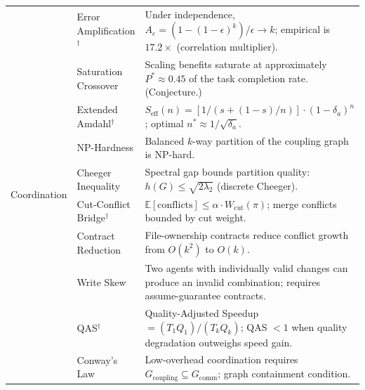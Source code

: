 \begin{table}[H]
\begin{tabular}{p{1.8cm}p{3.8cm}p{7.5cm}}
\midrule

\multirow{10}{1.8cm}{Coordination}
    & Error Amplification$^\dagger$ & Under independence, $A_e = (1-(1-\epsilon)^k)/\epsilon \to k$; empirical is $17.2\times$ (correlation multiplier). \\
    & Saturation Crossover & Scaling benefits saturate at approximately $P^* \approx 0.45$ of the task completion rate. (Conjecture.) \\
    & Extended Amdahl$^\dagger$ & $S_{\text{eff}}(n) = [1/(s+(1-s)/n)] \cdot (1-\delta_a)^n$; optimal $n^* \approx 1/\sqrt{\delta_a}$. \\
    & NP-Hardness & Balanced $k$-way partition of the coupling graph is NP-hard. \\
    & Cheeger Inequality & Spectral gap bounds partition quality: $h(G) \leq \sqrt{2\lambda_2}$ (discrete Cheeger). \\
    & Cut-Conflict Bridge$^\dagger$ & $\mathbb{E}[\text{conflicts}] \leq \alpha \cdot W_{\text{cut}}(\pi)$; merge conflicts bounded by cut weight. \\
    & Contract Reduction & File-ownership contracts reduce conflict growth from $O(k^2)$ to $O(k)$. \\
    & Write Skew & Two agents with individually valid changes can produce an invalid combination; requires assume-guarantee contracts. \\
    & QAS$^\dagger$ & Quality-Adjusted Speedup $= (T_1 Q_1)/(T_k Q_k)$; QAS $< 1$ when quality degradation outweighs speed gain. \\
    & Conway's Law & Low-overhead coordination requires $G_{\text{coupling}} \subseteq G_{\text{comm}}$; graph containment condition. \\

\midrule


\end{tabular}
\end{table}
